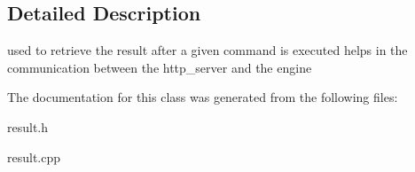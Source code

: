 \subsection{\-Detailed \-Description}
used to retrieve the result after a given command is executed helps in the communication between the http\-\_\-server and the engine 

\-The documentation for this class was generated from the following files\-:\begin{DoxyCompactItemize}
\item 
result.\-h\item 
result.\-cpp\end{DoxyCompactItemize}
